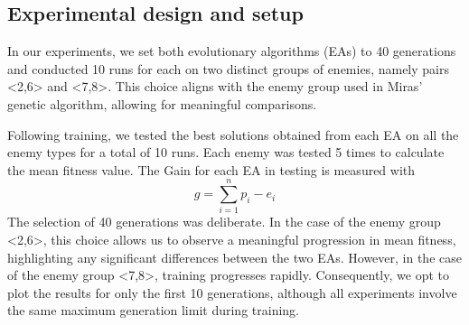 

\subsection{Experimental design and setup}
In our experiments, we set both evolutionary algorithms (EAs) to 40 generations and conducted 10 runs for each on two distinct groups of enemies, namely pairs <2,6> and <7,8>. This choice aligns with the enemy group used in Miras' genetic algorithm, allowing for meaningful comparisons.

Following training, we tested the best solutions obtained from each EA on all the enemy types for a total of 10 runs. Each enemy was tested 5 times to calculate the mean fitness value.
The Gain for each EA in testing is measured with 
\begin{equation}
    g = \sum \limits_{i = 1}^{n} p_i - e_i
\end{equation}
The selection of 40 generations was deliberate. In the case of the enemy group <2,6>, this choice allows us to observe a meaningful progression in mean fitness, highlighting any significant differences between the two EAs. However, in the case of the enemy group <7,8>, training progresses rapidly. Consequently, we opt to plot the results for only the first 10 generations, although all experiments involve the same maximum generation limit during training.



